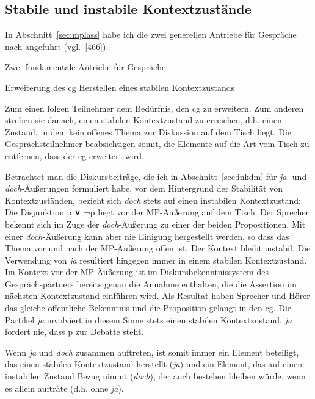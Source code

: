\subsection{Stabile und instabile Kontextzustände}
In Abschnitt~\ref{sec:mplass} habe ich die zwei generellen Antriebe für Gespräche nach \citet{Farkas2010} angeführt (vgl.\ \ref{466}).

\begin{exe}
	\ex\label{466} Zwei fundamentale Antriebe für Gespräche
 		\begin{xlist}
			\ex\label{466a} Erweiterung des cg
 			\ex\label{466b}	Herstellen eines stabilen Kontextzustands
 		\end{xlist}			
\end{exe}
Zum einen folgen Teilnehmer dem Bedürfnis, den cg zu erweitern. Zum anderen streben sie danach, einen stabilen Kontextzustand zu erreichen, d.h. einen Zustand, in dem kein offenes Thema zur Diskussion auf dem Tisch liegt. Die Gesprächsteilnehmer beabsichtigen somit, die Elemente auf die Art vom Tisch zu entfernen, dass der cg erweitert wird. 

Betrachtet man die Diskursbeiträge, die ich in Abschnitt~\ref{sec:inkdm} für \textit{ja}- und \textit{doch}-Äußerungen formuliert habe, vor dem Hintergrund der Stabilität von Kontextzuständen, bezieht sich \textit{doch} stets auf einen instabilen Kontextzu\-stand: Die Disjunktion p ∨ ¬p liegt vor der MP-Äußerung auf dem Tisch. Der Sprecher bekennt sich im Zuge der \textit{doch}-Äußerung zu einer der beiden Propositionen. Mit einer \textit{doch}-Äußerung kann aber nie Einigung hergestellt werden, so dass das Thema vor und nach der MP-Äußerung offen ist. Der Kontext bleibt instabil. Die Verwendung von \textit{ja} resultiert hingegen immer in einem stabilen Kontextzustand. Im Kontext vor der MP-Äußerung ist im Diskursbekenntnissystem des Gesprächspartners bereits genau die Annahme enthalten, die die Assertion im nächsten Kontextzustand einführen wird. Als Resultat haben Sprecher und Hörer das gleiche öffentliche Bekenntnis und die Proposition gelangt in den cg. Die Partikel \textit{ja} involviert in diesem Sinne stets einen stabilen Kontextzustand, \textit{ja} fordert nie, dass p zur Debatte steht. 

Wenn \textit{ja} und \textit{doch} zusammen auftreten, ist somit immer ein Element beteiligt, das einen stabilen Kontextzustand herstellt (\textit{ja}) und ein Element, das auf einen instabilen Zu\-stand Bezug nimmt (\textit{doch}), der auch bestehen bleiben würde, wenn es allein aufträte (d.h. ohne \textit{ja}).

